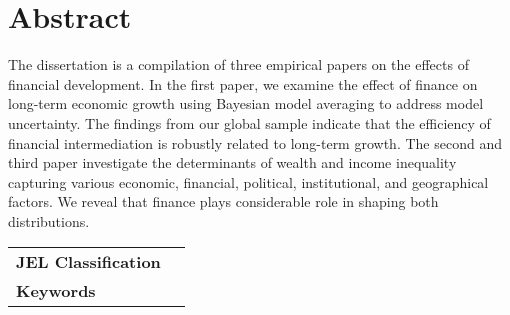 \section*{Abstract}
The dissertation is a compilation of three empirical papers on the effects of financial development. In the first paper, we examine the effect of finance on long-term economic growth using Bayesian model averaging to address model uncertainty. The findings from our global sample indicate that the efficiency of financial intermediation is robustly related to long-term growth. The second and third paper investigate the determinants of wealth and income inequality capturing various economic, financial, political, institutional, and geographical factors. We reveal that finance plays considerable role in shaping both distributions.

\vfill

\noindent\begin{tabular}{lp{8.6cm}}
		\textbf{JEL Classification} & \JEL \\
		\textbf{Keywords} & \Keywords \\
\end{tabular}






